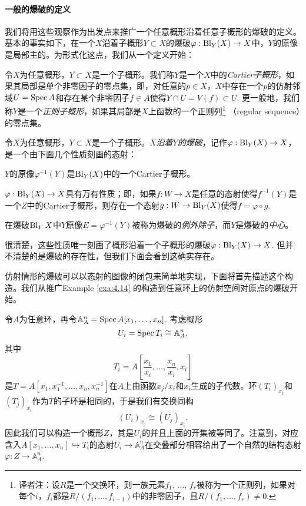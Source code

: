 \paragraph*{一般的爆破的定义}
我们将用这些观察作为出发点来推广一个任意概形沿着任意子概形的爆破的定义。基本的事实如下，在一个$X$沿着子概形$Y\subset X$的爆破$\varphi:\operatorname{Bl}_Y(X)\to X$中，$Y$的原像是局部主的。为形式化这点，我们从一个定义开始：


\begin{defi}\label{defi:4.15}
	令$X$为任意概形，$Y\subset X$是一个子概形。我们称$Y$是一个$X$中的\textit{Cartier子概形}，如果其局部是单个非零因子的零点集，即，对任意的$p\in X$，$X$中存在一个$p$的仿射邻域$U=\operatorname{Spec} A$和存在某个非零因子$f\in A$使得$Y\cap U=V(f)\subset U$. 更一般地，我们称$Y$是一个\textit{正则子概形}，如果其局部是$X$上函数的一个正则列\footnote{
		译者注：设$R$是一个交换环，则一族元素$f_1$, $\dots$, $f_r$被称为一个正则列，如果对每个$i$，$f_i$都是$R/(f_1,\dots,f_{i-1})$中的非零因子，且$R/(f_1,\dots,f_{r})\neq 0$.
	}%
	（regular sequence）的零点集。
\end{defi}

\begin{defi}\label{defi:4.16}
	令$X$为任意概形，$Y\subset X$是一个子概形。\textit{$X$沿着$Y$的爆破}，记作$\varphi:\operatorname{Bl}_Y(X)\to X$，是一个由下面几个性质刻画的态射：
	\begin{compactenum}[(1)]
		\item $Y$的原像$\varphi^{-1}(Y)$是$\operatorname{Bl}_Y(X)$中的一个Cartier子概形。
		\item $\varphi:\operatorname{Bl}_Y(X)\to X$具有万有性质；即，如果$f:W\to X$是任意的态射使得$f^{-1}(Y)$是一个$Z$中的Cartier子概形，则存在一个态射$g:W\to \operatorname{Bl}_Y(X)$使得$f=\varphi\circ g$.
	\end{compactenum}
	在爆破$\operatorname{Bl}_YX$中$Y$原像$E=\varphi^{-1}(Y)$被称为爆破的\textit{例外除子}，而$Y$是爆破的\textit{中心}。
\end{defi}

很清楚，这些性质唯一刻画了概形沿着一个子概形的爆破$\varphi:\operatorname{Bl}_Y(X)\to X$. 但并不清楚的是爆破的存在性，但我们下面会看到这确实存在。

仿射情形的爆破可以以态射的图像的闭包来简单地实现，下面将首先描述这个构造。我们从推广Example \ref{exa:4.14} 的构造到任意环上的仿射空间对原点的爆破开始。

\begin{exa}\label{exa:4.17}
	令$A$为任意环，再令$\mathbb A_A^n=\operatorname{Spec} A[x_1,\dots,x_n]$. 考虑概形
	\[
	U_i=\operatorname{Spec} T_i\cong \mathbb A_A^n,
	\]
	其中
	\[
		T_i=A\left[\frac{x_1}{x_i},\dots,\frac{x_n}{x_i},x_i\right]
	\]
	是$T=A[x_1,x_1^{-1},\dots,x_n,x_n^{-1}]$在$A$上由函数$x_j/x_i$和$x_i$生成的子代数。环$(T_{i})_{x_j}$和$(T_j)_{x_i}$作为$T$的子环是相同的，于是我们有交换同构
	\[
		(U_i)_{x_j}\cong (U_j)_{x_i}.
	\]
	因此我们可以构造一个概形$Z$，其是$U_i$的并且上面的开集被等同了。注意到，对应含入$A[x_1,\dots,x_n]\hookrightarrow T_i$的态射$U_i\to \mathbb A_A^n$在交叠部分相容给出了一个自然的结构态射$\varphi:Z\to \mathbb A_A^n$.
\end{exa}

